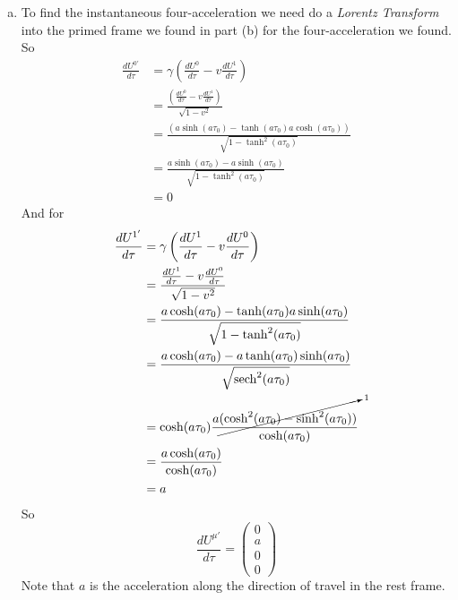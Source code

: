 \documentclass[11pt]{article}
\numberwithin{equation}{section}
\begin{document}
\begin{enumerate}[(a)]
\item
To find the instantaneous four-acceleration we need do a \emph{Lorentz Transform} into the primed frame we found in part (b) for the four-acceleration we found. So 
\begin{align*}  
\frac{dU^{0'}}{d\tau} &= \gamma\left(\frac{dU^0}{d\tau}-v\frac{dU^1}{d\tau}\right)\\
&= \frac{\left(\frac{dU^0}{d\tau}-v\frac{dU^1}{d\tau}\right)}{\sqrt{1-v^2}}\\
&= \frac{\left(a\sinh(a\tau_0)-\tanh(a\tau_0)a\cosh(a\tau_0)\right)}{\sqrt{1-\tanh^2(a\tau_0)}}\\
&= \frac{a\sinh(a\tau_0)-a\sinh(a\tau_0)}{\sqrt{1-\tanh^2(a\tau_0)}}\\
&= 0
\end{align*}  
And for 
\begin{align*}  
\frac{dU^{1'}}{d\tau} &= \gamma\left(\frac{dU^1}{d\tau} - v\frac{dU^0}{d\tau}\right)\\
&= \frac{\frac{dU^1}{d\tau} - v\frac{dU^0}{d\tau}}{\sqrt{1-v^2}}\\
&= \frac{a\cosh(a\tau_0) - \tanh(a\tau_0)a\sinh(a\tau_0)}{\sqrt{1-\tanh^2(a\tau_0)}}\\
&= \frac{a\cosh(a\tau_0) - a\tanh(a\tau_0)\sinh(a\tau_0)}{\sqrt{\textnormal{sech}^2(a\tau_0)}}\\
&= \cosh(a\tau_0)\frac{a\cancelto{1}{(\cosh^2(a\tau_0) - \sinh^2(a\tau_0))}}{\cosh(a\tau_0)}\\
&= \frac{a\cosh(a\tau_0)}{\cosh(a\tau_0)}\\
&= a
\end{align*}  
So
$$\frac{dU^{\mu'}}{d\tau} = \left(\begin{array}{c} 	0\\
					a\\
					0\\
					0\end{array}\right)$$
Note that $a$ is the acceleration along the direction of travel in the rest frame.
\end{enumerate}
\end{document}

